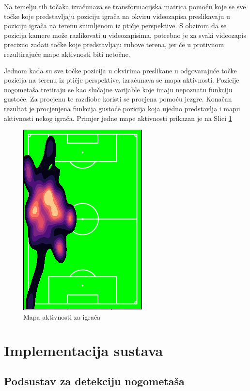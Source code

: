 \documentclass[times, utf8, seminar, numeric]{fer}
\begin{document}
Na temelju tih točaka izračunava se transformacijska matrica pomoću koje se sve točke koje predstavljaju poziciju igrača na okviru videozapisa preslikavaju u poziciju igrača na terenu snimljenom iz ptičje perspektive. S obzirom da se pozicija kamere može razlikovati u videozapisima, potrebno je za svaki videozapis precizno zadati točke koje predstavljaju rubove terena, jer će u protivnom rezultirajuće mape aktivnosti biti netočne.

Jednom kada su sve točke pozicija u okvirima preslikane u odgovarajuće točke pozicija na terenu iz ptičje perspektive, izračunava se mapa aktivnosti. Pozicije nogometaša tretiraju se kao slučajne varijable koje imaju nepoznatu funkciju gustoće. Za procjenu te razdiobe koristi se procjena pomoću jezgre. Konačan rezultat je procjenjena funkcija gustoće pozicija koja ujedno predstavlja i mapu aktivnosti nekog igrača. Primjer jedne mape aktivnosti prikazan je na Slici \ref{fig:heatmap}

\begin{figure}
	\centering
	\includegraphics[scale=1]{slike/heatmap.png}
	\caption {Mapa aktivnosti za igrača}
	\label{fig:heatmap}	
\end{figure}


\chapter{Implementacija sustava}

\section{Podsustav za detekciju nogometaša}
\end{document}
